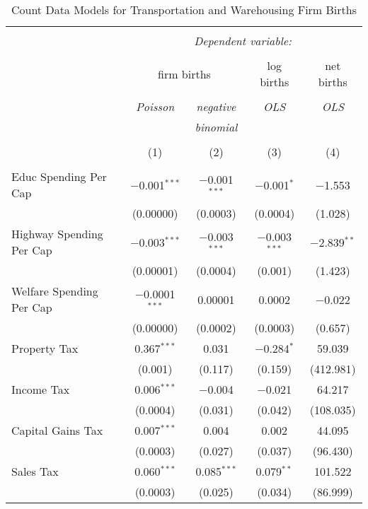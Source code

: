 
\begin{table}[!htbp] \centering 
  \caption{Count Data Models for Transportation and Warehousing Firm Births} 
  \label{} 
\begin{tabular}{@{\extracolsep{5pt}}lcccc} 
\\[-1.8ex]\hline 
\hline \\[-1.8ex] 
 & \multicolumn{4}{c}{\textit{Dependent variable:}} \\ 
\cline{2-5} 
\\[-1.8ex] & \multicolumn{2}{c}{firm births} & log births & net births \\ 
\\[-1.8ex] & \textit{Poisson} & \textit{negative} & \textit{OLS} & \textit{OLS} \\ 
 & \textit{} & \textit{binomial} & \textit{} & \textit{} \\ 
\\[-1.8ex] & (1) & (2) & (3) & (4)\\ 
\hline \\[-1.8ex] 
 Educ Spending Per Cap & $-$0.001$^{***}$ & $-$0.001$^{***}$ & $-$0.001$^{*}$ & $-$1.553 \\ 
  & (0.00000) & (0.0003) & (0.0004) & (1.028) \\ 
  Highway Spending Per Cap  & $-$0.003$^{***}$ & $-$0.003$^{***}$ & $-$0.003$^{***}$ & $-$2.839$^{**}$ \\ 
  & (0.00001) & (0.0004) & (0.001) & (1.423) \\ 
  Welfare Spending Per Cap  & $-$0.0001$^{***}$ & 0.00001 & 0.0002 & $-$0.022 \\ 
  & (0.00000) & (0.0002) & (0.0003) & (0.657) \\ 
  Property Tax & 0.367$^{***}$ & 0.031 & $-$0.284$^{*}$ & 59.039 \\ 
  & (0.001) & (0.117) & (0.159) & (412.981) \\ 
  Income Tax & 0.006$^{***}$ & $-$0.004 & $-$0.021 & 64.217 \\ 
  & (0.0004) & (0.031) & (0.042) & (108.035) \\ 
  Capital Gains Tax & 0.007$^{***}$ & 0.004 & 0.002 & 44.095 \\ 
  & (0.0003) & (0.027) & (0.037) & (96.430) \\ 
  Sales Tax & 0.060$^{***}$ & 0.085$^{***}$ & 0.079$^{**}$ & 101.522 \\ 
  & (0.0003) & (0.025) & (0.034) & (86.999) \\ 

\end{tabular}
\end{table}
